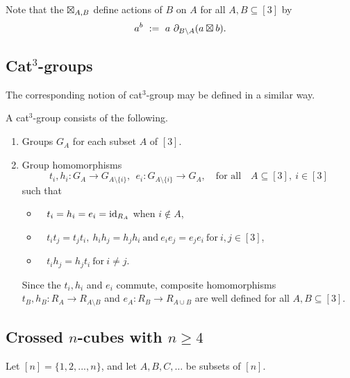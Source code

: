 \noindent
Note that the $\boxtimes_{A,B}$ define actions of $B$ on $A$ for all 
$A,B \subseteq [3]$ by
$$
a^b ~:=~ a\ \partial_{B \setminus A}(a \boxtimes b).
$$



\subsection{Cat$^3$-groups}  

The corresponding notion of cat$^3$-group may be defined in a similar way.

\begin{defn} 
A cat$^3$-group consists of the following.
\begin{enumerate}[{\rm (i)}]
\item
Groups  $G_A$  for each subset  $A$  of  $[3]$. 

\item
Group homomorphisms
$$
t_i, h_i : G_A \to G_{A \setminus \{i\}}, ~~
e_i : G_{A \setminus \{i\}} \to G_A,
\quad\mbox{for all} \quad 
A \subseteq [3],~ i \in [3]
$$
such that
\begin{itemize}
\item~  
$t_i = h_i = e_i = \mathrm{id}_{R_A}$  when  $i \notin A$,
\item~ 
$t_i t_j = t_j t_i,~
 h_i h_j = h_j h_i ~\mbox{and}~
 e_i e_j = e_j e_i ~\mbox{for}~ i,j \in [3]$,
\item~
$t_i h_j = h_j t_i ~\mbox{for}~ i \neq j$.
\end{itemize}

\noindent
Since the $t_i, h_i$ and $e_i$ commute, composite homomorphisms
$t_B, h_B : R_A \to R_{A \setminus B}$ and 
$e_A : R_B \to R_{A \cup B}$ 
are well defined for all $A,B \subseteq [3]$.
\end{enumerate}
\end{defn}



\vspace{12mm}
\subsection{Crossed $n$-cubes with $n \geqslant 4$} 

Let $[n] = \{1,2,...,n\}$, and let $A,B,C,\ldots$ be subsets of $[n]$.

